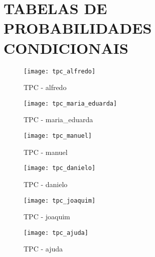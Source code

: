 \chapter{TABELAS DE PROBABILIDADES CONDICIONAIS}
\label{ap:tpc}

\begin{figure}[ht!]
    \centering
    \begin{minipage}{\textwidth}
        \caption{TPC - alfredo}
        \texttt{[image: tpc\_alfredo]}
    \end{minipage}
\end{figure}

\begin{figure}[ht!]
    \centering
    \begin{minipage}{\textwidth}
        \caption{TPC - maria\_eduarda}
        \texttt{[image: tpc\_maria\_eduarda]}
    \end{minipage}
\end{figure}

\begin{figure}[ht!]
    \centering
    \begin{minipage}{\textwidth}
        \caption{TPC - manuel}
        \texttt{[image: tpc\_manuel]}
    \end{minipage}
\end{figure}

\begin{figure}[ht!]
    \centering
    \begin{minipage}{\textwidth}
        \caption{TPC - danielo}
        \texttt{[image: tpc\_danielo]}
    \end{minipage}
\end{figure}

\begin{figure}[ht!]
    \centering
    \begin{minipage}{\textwidth}
        \caption{TPC - joaquim}
        \texttt{[image: tpc\_joaquim]}
    \end{minipage}
\end{figure}

\begin{figure}[ht!]
    \centering
    \begin{minipage}{\textwidth}
        \caption{TPC - ajuda}
        \texttt{[image: tpc\_ajuda]}
    \end{minipage}
\end{figure}

